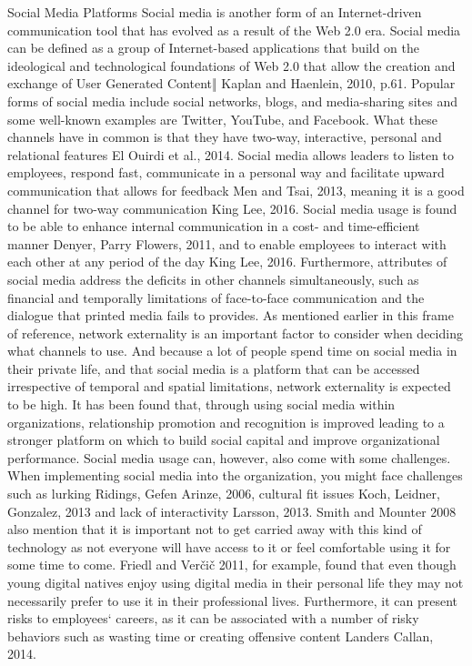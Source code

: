 Social Media Platforms
Social media is another form of an Internet-driven communication tool that has evolved as a result of the Web 2.0 era. Social media can be defined as a group of Internet-based applications that build on the ideological and technological foundations of Web 2.0 that allow the creation and exchange of User Generated Content‖ Kaplan and Haenlein, 2010, p.61. Popular forms of social media include social networks, blogs, and media-sharing sites and some well-known examples are Twitter, YouTube, and Facebook. What these channels have in common is that they have two-way, interactive, personal and relational features El Ouirdi et al., 2014.
Social media allows leaders to listen to employees, respond fast, communicate in a personal way and facilitate upward communication that allows for feedback Men and Tsai, 2013, meaning it is a good channel for two-way communication King  Lee, 2016. Social media usage is found to be able to enhance internal communication in a cost- and time-efficient manner Denyer, Parry  Flowers, 2011, and to enable employees to interact with each other at any period of the day King  Lee, 2016. 
Furthermore, attributes of social media address the deficits in other channels simultaneously, such as financial and temporally limitations of face-to-face communication and the dialogue that printed media fails to provides. As mentioned earlier in this frame of reference, network externality is an important factor to consider when deciding what channels to use. And because a lot of people spend time on social media in their private life, and that social media is a platform that can be accessed irrespective of temporal and spatial limitations, network externality is expected to be high. It has been found that, through using social media within organizations, relationship promotion and recognition is improved leading to a stronger platform on which to build social capital and improve organizational performance.
Social media usage can, however, also come with some challenges. When implementing social media into the organization, you might face challenges such as lurking Ridings, Gefen  Arinze, 2006, cultural fit issues Koch, Leidner,  Gonzalez, 2013 and lack of interactivity Larsson, 2013. Smith and Mounter 2008 also mention that it is important not to get carried away with this kind of technology as not everyone will have access to it or feel comfortable using it for some time to come. Friedl and Verčič 2011, for example, found that even though young digital natives enjoy using digital media in their personal life they may not necessarily prefer to use it in their professional lives. Furthermore, it can present risks to employees‘ careers, as it can be associated with a number of risky behaviors such as wasting time or creating offensive content Landers  Callan, 2014.
